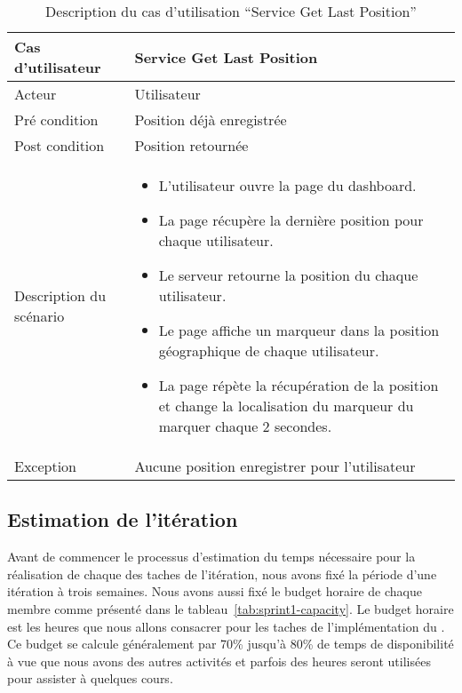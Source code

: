 \begin{table}[H]
    \centering
    \begin{tabular}{| p{3cm} | l |}
        \hline
        Cas d'utilisateur & Service Get Last Position \\ \hline
        Acteur & Utilisateur \\ \hline
        Pré condition & Position déjà enregistrée \\ \hline
        Post condition & Position retournée \\ \hline
        Description du scénario &
        \begin{minipage}{11cm}
            \vspace*{0.2cm}
            \begin{itemize}
                \item L'utilisateur ouvre la page du dashboard.
                \item La page récupère la dernière position pour chaque utilisateur.
                \item Le serveur retourne la position du chaque utilisateur.
                \item Le page affiche un marqueur dans la position géographique de chaque utilisateur.
                \item La page répète la récupération de la position et change la localisation du marqueur du marquer chaque 2 secondes.
            \end{itemize}
            \vspace{0.1cm}
        \end{minipage} \\ \hline
        Exception & Aucune position enregistrer pour l'utilisateur \\ \hline
    \end{tabular}
    \caption{Description du cas d'utilisation ``Service Get Last Position''}
\end{table}

\subsection{Estimation de l'itération}

Avant de commencer le processus d'estimation du temps nécessaire pour la
réalisation de chaque des taches de l'itération, nous avons fixé la période d'une
itération à trois semaines. Nous avons aussi fixé le budget horaire de chaque membre
comme présenté dans le tableau~\ref{tab:sprint1-capacity}. Le budget horaire
est les heures que nous allons consacrer pour les taches de l'implémentation du
. Ce budget se calcule généralement par 70\% jusqu'à 80\%
de temps de disponibilité à  vue que nous avons des autres
activités et parfois des heures seront utilisées pour assister à quelques cours.

